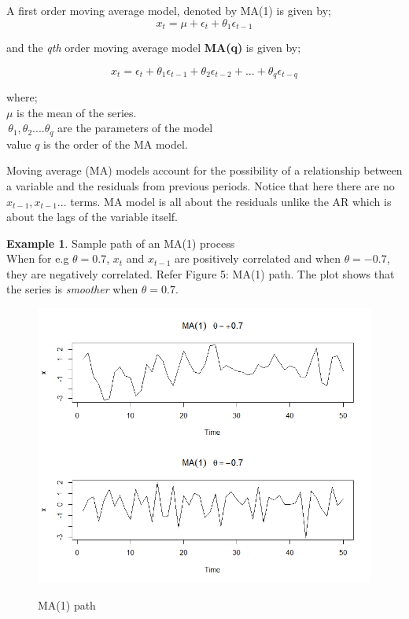 \documentclass[a4paper]{article}
\theoremstyle{definition}
\newtheorem{exmp}{Example}[section]
\begin{document}
A first order moving average model, denoted by MA(1) is	given by; 
\begin{equation*}
x_t =\mu + \epsilon_t +\theta_1\epsilon_{t-1}
\end{equation*}

and the \textit{qth} order moving average model \textbf{MA(q)} is given by; 

\begin{equation*}
x_t = \epsilon_t +\theta_1\epsilon_{t-1}+\theta_2\epsilon_{t-2}+\dots + \theta_q\epsilon_{t-q}
\end{equation*}

where;\\
$ \mu $ is the mean of the series. \\
$ \,\theta_1,\theta_2....\theta_q $ are the parameters of the model \\
value $ q $ is the order of the MA model. 

Moving average (MA) models account for the possibility of a relationship between a variable
and the residuals from previous periods. Notice that here there are no $ x_{t-1}, x_{t-1} ... $ terms. MA model is all about the residuals unlike the AR which is about the lags of the variable itself. \\

\begin{exmp}{Sample path of an MA(1) process}\\
When for e.g $ \theta = 0.7 $,  $ x_t $ and $ x_{t-1} $ are positively correlated and when $ \theta = - 0.7 $, they are negatively correlated. Refer Figure 5: MA(1) path. The plot shows that the series is \textit{smoother} when $ \theta = 0.7 $. 
\end{exmp}

\begin{figure}
\centering
\includegraphics[width=0.9\linewidth]{ma1}
\label{ma1}
\caption{MA(1) path}
\end{figure}
\end{document}
